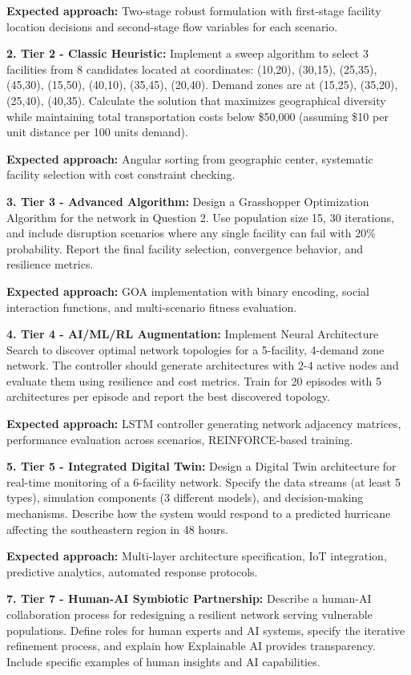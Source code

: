 \documentclass{article}
\begin{document}
\textbf{Expected approach:} Two-stage robust formulation with first-stage facility location decisions and second-stage flow variables for each scenario.

\textbf{2. Tier 2 - Classic Heuristic:}
Implement a sweep algorithm to select 3 facilities from 8 candidates located at coordinates: (10,20), (30,15), (25,35), (45,30), (15,50), (40,10), (35,45), (20,40). Demand zones are at (15,25), (35,20), (25,40), (40,35). Calculate the solution that maximizes geographical diversity while maintaining total transportation costs below \$50,000 (assuming \$10 per unit distance per 100 units demand).

\textbf{Expected approach:} Angular sorting from geographic center, systematic facility selection with cost constraint checking.

\textbf{3. Tier 3 - Advanced Algorithm:}
Design a Grasshopper Optimization Algorithm for the network in Question 2. Use population size 15, 30 iterations, and include disruption scenarios where any single facility can fail with 20\% probability. Report the final facility selection, convergence behavior, and resilience metrics.

\textbf{Expected approach:} GOA implementation with binary encoding, social interaction functions, and multi-scenario fitness evaluation.

\textbf{4. Tier 4 - AI/ML/RL Augmentation:}
Implement Neural Architecture Search to discover optimal network topologies for a 5-facility, 4-demand zone network. The controller should generate architectures with 2-4 active nodes and evaluate them using resilience and cost metrics. Train for 20 episodes with 5 architectures per episode and report the best discovered topology.

\textbf{Expected approach:} LSTM controller generating network adjacency matrices, performance evaluation across scenarios, REINFORCE-based training.

\textbf{5. Tier 5 - Integrated Digital Twin:}
Design a Digital Twin architecture for real-time monitoring of a 6-facility network. Specify the data streams (at least 5 types), simulation components (3 different models), and decision-making mechanisms. Describe how the system would respond to a predicted hurricane affecting the southeastern region in 48 hours.

\textbf{Expected approach:} Multi-layer architecture specification, IoT integration, predictive analytics, automated response protocols.

\textbf{7. Tier 7 - Human-AI Symbiotic Partnership:}
Describe a human-AI collaboration process for redesigning a resilient network serving vulnerable populations. Define roles for human experts and AI systems, specify the iterative refinement process, and explain how Explainable AI provides transparency. Include specific examples of human insights and AI capabilities.
\end{document}
